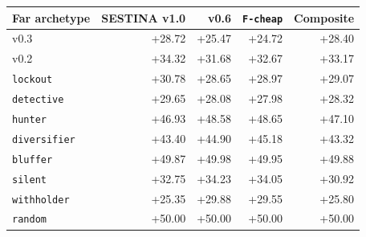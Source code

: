 \begin{tabular}{lrrrr}
\toprule
Far archetype & SESTINA v1.0 & v0.6 & \texttt{F-cheap} & Composite \\
\midrule
v0.3 & +28.72 & +25.47 & +24.72 & +28.40 \\
v0.2 & +34.32 & +31.68 & +32.67 & +33.17 \\
\texttt{lockout} & +30.78 & +28.65 & +28.97 & +29.07 \\
\texttt{detective} & +29.65 & +28.08 & +27.98 & +28.32 \\
\texttt{hunter} & +46.93 & +48.58 & +48.65 & +47.10 \\
\texttt{diversifier} & +43.40 & +44.90 & +45.18 & +43.32 \\
\texttt{bluffer} & +49.87 & +49.98 & +49.95 & +49.88 \\
\texttt{silent} & +32.75 & +34.23 & +34.05 & +30.92 \\
\texttt{withholder} & +25.35 & +29.88 & +29.55 & +25.80 \\
\texttt{random} & +50.00 & +50.00 & +50.00 & +50.00 \\
\bottomrule
\end{tabular}
